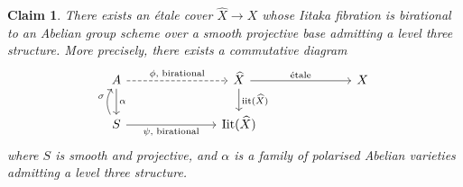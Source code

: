 \documentclass[JEP,XML,SOM,Unicode,published]{cedram}
\let\ts\relax
\theoremstyle{plain}
\newtheorem{claim}[thm]{Claim}
\theoremstyle{definition}
\numberwithin{equation}{thm}
\numberwithin{enumi}{thm}
\DeclareMathOperator{\iit}{iit}
\DeclareMathOperator{\Iit}{Iit}
\let\what\widehat
\begin{document}
\begin{claim}\label{claim:glfg}
There exists an étale cover $\what{X} \to X$ whose Iitaka fibration is
birational to an Abelian group scheme over a smooth projective base admitting
a level three structure. More precisely, there exists a commutative diagram
\begin{equation}\label{eq:glfg}
\begin{tikzcd}[column sep=2.5cm]
A \ar[r, dashed, "\ts\phi\text{, birational}"] \ar[d, "\ts\alpha"] & \what{X} \ar[r, "\ts\text{étale}"] \ar[d, "\ts\iit(\what{X})"] & X \\
S \ar[r, "\ts\psi\text{, birational}"'] \ar[u, bend left, "\ts\sigma"] & \Iit(\what{X})
\end{tikzcd}
\end{equation}
where $S$ is smooth and projective, and $\alpha$ is a family of polarised Abelian
varieties admitting a level three structure.
\end{claim}
\end{document}
